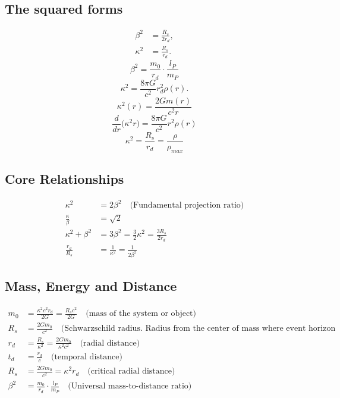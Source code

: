 \documentclass[12pt, a4paper]{article}
\begin{document}
\subsection{The squared forms}

\begin{align}
    \beta^2 &= \frac{R_s}{2r_{d}}, \\
    \kappa^2 &= \frac{R_s}{r_{d}}.
\end{align}
\begin{equation}
 \beta^2=\frac{m_0}{r_{d}} \cdot \frac{l_P}{m_P} 
\end{equation}
\begin{equation}
\kappa^2 = \frac{8\pi G}{c^2} r_{d}^2 \rho(r).
\end{equation}
\[
\kappa^{2}(r)=\dfrac{2G m(r)}{c^{2} r}
\]
\[
\dfrac{d}{dr}\!\bigl(\kappa^{2}r\bigr)=\dfrac{8\pi G}{c^{2}}r^{2}\rho(r)
\]
\[
\boxed{
\kappa^2=\frac{R_s}{r_{d}} = \frac{\rho}{\rho_{max} }
}
\]

\subsection{Core Relationships}

\begin{align}
    \kappa^2 &= 2\beta^2 \quad \text{(Fundamental projection ratio)} \\
    \frac{\kappa}{\beta} &= \sqrt{2} \\
    \kappa^2 + \beta^2 &= 3\beta^2 = \frac{3}{2}\kappa^2 = \frac{3R_s}{2r_{d}} \\
    \frac{r_{d}}{R_s} &= \frac{1}{\kappa^2} = \frac{1}{2\beta^2}
\end{align}

\subsection{Mass, Energy and Distance}

\begin{align}
    m_0 &= \frac{\kappa^2 c^2 r_{d}}{2G} = \frac{R_s c^2}{2G} \quad \text{(mass of the system or object)}\\
    R_s &=\frac{2Gm_0}{c^2} \quad \text{(Schwarzschild radius. Radius from the center of mass where event horizon is forming)} \\
    r_{d} &= \frac{R_s}{\kappa^2} = \frac{2Gm_0}{\kappa^2 c^2}  \quad \text{(radial distance)}\\
    t_{d} &= \frac{r_{d}}{c}  \quad \text{(temporal distance)}\\
    R_s &= \frac{2Gm_0}{c^2}=\kappa^2 r_{d} \quad \text{(critical radial distance)} \\
   \beta^2 &=  \frac{m_0}{r_{d}} \cdot \frac{l_P}{m_P} \quad \text{(Universal mass-to-distance ratio)}
\end{align}
\end{document}
